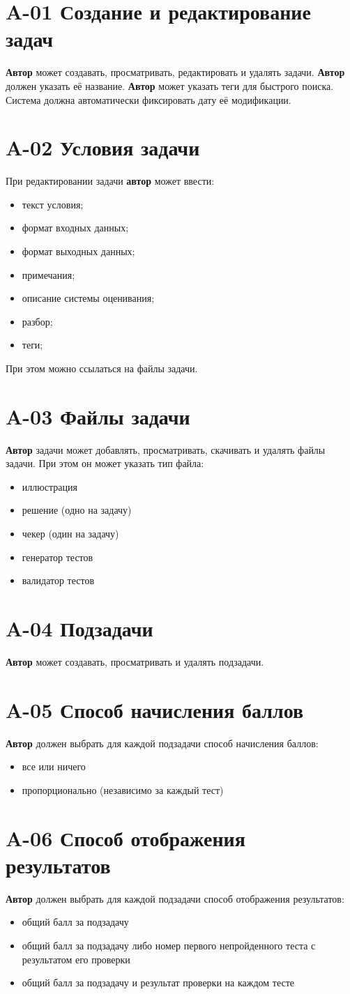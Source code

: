 \documentclass{book}
\newcommand{\newcard}[1]{\newpage \section*{#1}}
\begin{document}
\newcard{A-01 Создание и редактирование задач}
\textbf{Автор} может создавать, просматривать, редактировать и удалять задачи. 
\textbf{Автор} должен указать её название.
\textbf{Автор} может указать теги для быстрого поиска.
Система должна автоматически фиксировать дату её модификации.


\newcard{A-02 Условия задачи}
При редактировании задачи \textbf{автор} может ввести:
\begin{itemize}\setlength\itemsep{0pt}
	\item текст условия;
	\item формат входных данных;
	\item формат выходных данных;
	\item примечания;
	\item описание системы оценивания;
	\item разбор;
	\item теги;
\end{itemize}
При этом можно ссылаться на файлы задачи.


\newcard{A-03 Файлы задачи}
\textbf{Автор} задачи может добавлять, просматривать, скачивать и удалять файлы задачи. При этом он может указать тип файла:
\begin{itemize}\setlength{\itemsep}{0pt}
	\item иллюстрация
	\item решение (одно на задачу)
	\item чекер (один на задачу)
	\item генератор тестов
	\item валидатор тестов
\end{itemize}


\newcard{A-04 Подзадачи}
\textbf{Автор} может создавать, просматривать и удалять подзадачи. 


\newcard{A-05 Способ начисления баллов}
\textbf{Автор} должен выбрать для каждой подзадачи способ начисления баллов:
\begin{itemize}\setlength{\itemsep}{0pt}
	\item все или ничего
	\item пропорционально (независимо за каждый тест)
\end{itemize}


\newcard{A-06 Способ отображения результатов}
\textbf{Автор} должен выбрать для каждой подзадачи способ отображения результатов:
\begin{itemize}\setlength{\itemsep}{0pt}
	\item общий балл за подзадачу
	\item общий балл за подзадачу либо номер первого непройденного теста с результатом его проверки
	\item общий балл за подзадачу и результат проверки на каждом тесте
\end{itemize}
\end{document}

